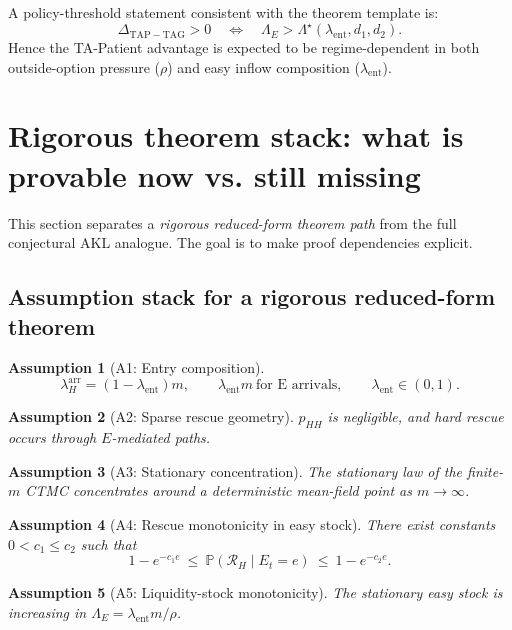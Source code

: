 \documentclass{article}
\newtheorem{assumption}{Assumption}
\newcommand{\PP}{\mathbb{P}}
\begin{document}
A policy-threshold statement consistent with the theorem template is:
\[
\Delta_{\mathrm{TAP}\!-\!\mathrm{TAG}}>0
\quad\Longleftrightarrow\quad
\Lambda_E>\Lambda^\star(\lambda_{\mathrm{ent}},d_1,d_2).
\]
Hence the TA-Patient advantage is expected to be regime-dependent in both outside-option pressure (\(\rho\)) and easy inflow composition (\(\lambda_{\mathrm{ent}}\)).

\section{Rigorous theorem stack: what is provable now vs. still missing}

This section separates a \emph{rigorous reduced-form theorem path} from the full conjectural AKL analogue. The goal is to make proof dependencies explicit.

\subsection{Assumption stack for a rigorous reduced-form theorem}

\begin{assumption}[A1: Entry composition]
\[
\lambda_H^{\mathrm{arr}}=(1-\lambda_{\mathrm{ent}})m,\qquad
\lambda_{\mathrm{ent}}m\ \text{for E arrivals},\qquad
\lambda_{\mathrm{ent}}\in(0,1).
\]
\end{assumption}

\begin{assumption}[A2: Sparse rescue geometry]
\(p_{HH}\) is negligible, and hard rescue occurs through \(E\)-mediated paths.
\end{assumption}

\begin{assumption}[A3: Stationary concentration]
The stationary law of the finite-\(m\) CTMC concentrates around a deterministic mean-field point as \(m\to\infty\).
\end{assumption}

\begin{assumption}[A4: Rescue monotonicity in easy stock]
There exist constants \(0<c_1\le c_2\) such that
\[
1-e^{-c_1 e}\ \le\ \PP(\mathcal R_H\mid E_t=e)\ \le\ 1-e^{-c_2 e}.
\]
\end{assumption}

\begin{assumption}[A5: Liquidity-stock monotonicity]
The stationary easy stock is increasing in \(\Lambda_E=\lambda_{\mathrm{ent}}m/\rho\).
\end{assumption}
\end{document}
